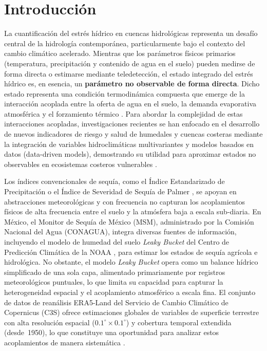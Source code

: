 \documentclass[12pt, a4paper]{article}
\begin{document}
\section{Introducción}
\label{sec:introduccion}

La cuantificación del estrés hídrico en cuencas hidrológicas representa un desafío central de la hidrología contemporánea, particularmente bajo el contexto del cambio climático acelerado. Mientras que los parámetros físicos primarios (temperatura, precipitación y contenido de agua en el suelo) pueden medirse de forma directa o estimarse mediante teledetección, el estado integrado del estrés hídrico es, en esencia, un \textbf{parámetro no observable de forma directa}. Dicho estado representa una condición termodinámica compuesta que emerge de la interacción acoplada entre la oferta de agua en el suelo, la demanda evaporativa atmosférica y el forzamiento térmico \parencite{seneviratne2010investigating}. Para abordar la complejidad de estas interacciones acopladas, investigaciones recientes se han enfocado en el desarrollo de nuevos indicadores de riesgo y salud de humedales y cuencas costeras mediante la integración de variables hidroclimáticas multivariantes y modelos basados en datos (data-driven models), demostrando su utilidad para aproximar estados no observables en ecosistemas costeros vulnerables \parencite{elyasi2025proposing}.

Los índices convencionales de sequía, como el Índice Estandarizado de Precipitación \parencite[SPI;][]{mckee1993relationship} o el Índice de Severidad de Sequía de Palmer \parencite[PDSI;][]{palmer1965meteorological}, se apoyan en abstracciones meteorológicas y con frecuencia no capturan los acoplamientos físicos de alta frecuencia entre el suelo y la atmósfera baja a escala sub-diaria. En México, el Monitor de Sequía de México (MSM), administrado por la Comisión Nacional del Agua (CONAGUA), integra diversas fuentes de información, incluyendo el modelo de humedad del suelo \emph{Leaky Bucket} del Centro de Predicción Climática de la NOAA \parencite{lobato2016monitor}, para estimar los estados de sequía agrícola e hidrológica. No obstante, el modelo \emph{Leaky Bucket} opera como un balance hídrico simplificado de una sola capa, alimentado primariamente por registros meteorológicos puntuales, lo que limita su capacidad para capturar la heterogeneidad espacial y el acoplamiento atmosférico a escala fina. El conjunto de datos de reanálisis ERA5-Land del Servicio de Cambio Climático de Copernicus (C3S) ofrece estimaciones globales de variables de superficie terrestre con alta resolución espacial ($0.1^\circ \times 0.1^\circ$) y cobertura temporal extendida (desde~1950), lo que constituye una oportunidad para analizar estos acoplamientos de manera sistemática \parencite{munoz2021era5}.
\end{document}
